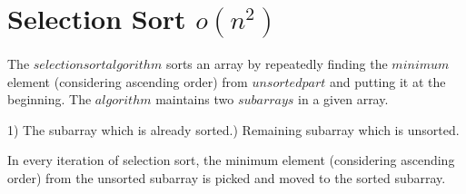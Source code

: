 \section{Selection Sort $o(n^2)$}


The $selection sort algorithm$ sorts an array by repeatedly finding the $minimum$ element (considering ascending order) from $unsorted part$ and putting it at the beginning. The $algorithm$ maintains two $subarrays$ in a given array.\newline

1) The subarray which is already sorted.) Remaining subarray which is unsorted.\newline

In every iteration of selection sort, the minimum element (considering ascending order) from the unsorted subarray is picked and moved to the sorted subarray.\newline
    
